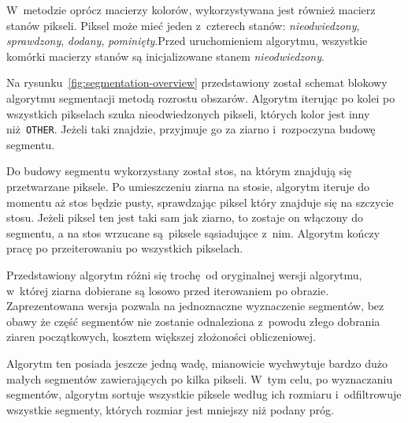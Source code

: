 W~metodzie oprócz macierzy kolorów, wykorzystywana jest również macierz stanów pikseli. Piksel może mieć jeden z~czterech stanów: \emph{nieodwiedzony}, \emph{sprawdzony}, \emph{dodany}, \emph{pominięty}.Przed uruchomieniem algorytmu, wszystkie komórki macierzy stanów są inicjalizowane stanem \emph{nieodwiedzony}.


Na rysunku~\ref{fig:segmentation-overview} przedstawiony został schemat blokowy algorytmu segmentacji metodą rozrostu obszarów. Algorytm iterując po kolei po wszystkich pikselach szuka nieodwiedzonych pikseli, których kolor jest inny niż \texttt{OTHER}. Jeżeli taki znajdzie, przyjmuje go za ziarno i~rozpoczyna budowę segmentu.

Do budowy segmentu wykorzystany został stos, na którym znajdują się przetwarzane piksele. Po umieszczeniu ziarna na stosie, algorytm iteruje do momentu aż stos będzie pusty, sprawdzając piksel który znajduje się na szczycie stosu. Jeżeli piksel ten jest taki sam jak ziarno, to zostaje on włączony do segmentu, a na stos wrzucane są piksele sąsiadujące z~nim. Algorytm kończy pracę po przeiterowaniu po wszystkich pikselach.

Przedstawiony algorytm różni się trochę od oryginalnej wersji algorytmu, w~której ziarna dobierane są losowo przed iterowaniem po obrazie. Zaprezentowana wersja pozwala na jednoznaczne wyznaczenie segmentów, bez obawy że część segmentów nie zostanie odnaleziona z~powodu złego dobrania ziaren początkowych, kosztem większej złożoności obliczeniowej.

Algorytm ten posiada jeszcze jedną wadę, mianowicie wychwytuje bardzo dużo małych segmentów zawierających po kilka pikseli. W~tym celu, po wyznaczaniu segmentów, algorytm sortuje wszystkie piksele według ich rozmiaru i~odfiltrowuje wszystkie segmenty, których rozmiar jest mniejszy niż podany próg.

